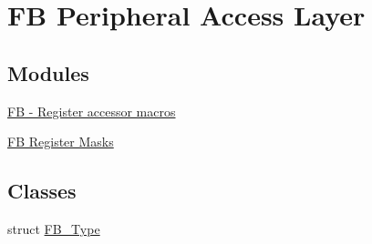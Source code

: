 \hypertarget{group__FB__Peripheral__Access__Layer}{}\section{FB Peripheral Access Layer}
\label{group__FB__Peripheral__Access__Layer}
\subsection*{Modules}
\begin{DoxyCompactItemize}
\item 
\hyperlink{group__FB__Register__Accessor__Macros}{F\+B -\/ Register accessor macros}
\item 
\hyperlink{group__FB__Register__Masks}{F\+B Register Masks}
\end{DoxyCompactItemize}
\subsection*{Classes}
\begin{DoxyCompactItemize}
\item 
struct \hyperlink{structFB__Type}{F\+B\+\_\+\+Type}
\end{DoxyCompactItemize}

